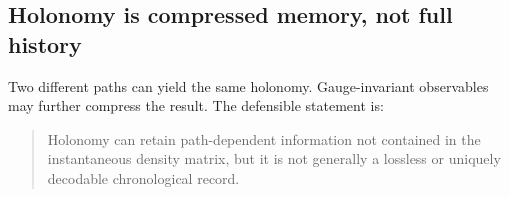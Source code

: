 \subsection{Holonomy is compressed memory, not full history}

Two different paths can yield the same holonomy. Gauge-invariant observables may further compress the result. The defensible statement is:

\begin{quote}
Holonomy can retain path-dependent information not contained in the instantaneous density matrix, but it is not generally a lossless or uniquely decodable chronological record.
\end{quote}

